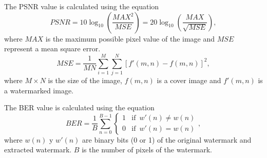 \documentclass[runningheads]{llncs}
\begin{document}
	The PSNR value is calculated using the equation
\begin{equation}
PSNR=10\log_{10}\left(\frac{MAX^{2}}{MSE}\right)=20\log_{10}\left(\frac{MAX}{\sqrt{MSE}}\right),
\label{equation_psnr}
\end{equation}
where $MAX$ is the maximum possible pixel value of the image and $MSE$
represent a mean square error.
\begin{equation}
MSE=\frac{1}{MN}\sum_{i=1}^{M}\sum_{j=1}^{N}\left[f'(m,n)-f(m,n)\right]^{2},
\end{equation}
where $M\times N$ is the size of the image, $f(m,n)$ is a cover image and $f'(m,n)$ is a watermarked image.

The BER value is calculated using the equation
\begin{equation}
BER=\frac{1}{B}\sum_{n=0}^{B-1}
\begin{cases}
1 & \mbox{if }\, w'(n)\neq w(n)\\
0 & \mbox{if }\, w'(n)=w(n)
\end{cases}
\label{ber},
\end{equation}
where $w(n)$ y $w'(n)$ are binary bits (0 or 1) of the original watermark and extracted watermark. $B$ is the number of pixels of the watermark.
	
\end{document}
